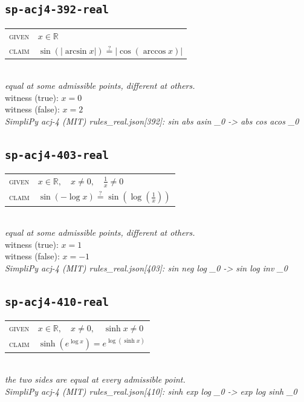 \documentclass[11pt]{article}
\begin{document}
\subsection*{\texttt{sp-acj4-392-real}}
\begin{tabular}{@{}l@{\quad}l@{}}
\textsc{given} & $x \in \mathbb{R}$ \\[4pt]
\textsc{claim} & $\displaystyle \sin\left(\left|\arcsin x\right|\right) \overset{?}{=} \left|\cos\left(\arccos x\right)\right|$ \\
\end{tabular}\\[2pt]
{\small\emph{equal at some admissible points, different at others.}}\\
{\footnotesize\color{gray}witness (true): $x = 0$}\\
{\footnotesize\color{gray}witness (false): $x = 2$}\\
\emph{SimpliPy acj-4 (MIT) rules\_real.json[392]: sin abs asin \_0  ->  abs cos acos \_0}\\

\subsection*{\texttt{sp-acj4-403-real}}
\begin{tabular}{@{}l@{\quad}l@{}}
\textsc{given} & $x \in \mathbb{R},\quad x \neq 0,\quad \frac{1}{x} \neq 0$ \\[4pt]
\textsc{claim} & $\displaystyle \sin\left(-\log x\right) \overset{?}{=} \sin\left(\log\left(\frac{1}{x}\right)\right)$ \\
\end{tabular}\\[2pt]
{\small\emph{equal at some admissible points, different at others.}}\\
{\footnotesize\color{gray}witness (true): $x = 1$}\\
{\footnotesize\color{gray}witness (false): $x = -1$}\\
\emph{SimpliPy acj-4 (MIT) rules\_real.json[403]: sin neg log \_0  ->  sin log inv \_0}\\

\subsection*{\texttt{sp-acj4-410-real}}
\begin{tabular}{@{}l@{\quad}l@{}}
\textsc{given} & $x \in \mathbb{R},\quad x \neq 0,\quad \sinh x \neq 0$ \\[4pt]
\textsc{claim} & $\displaystyle \sinh\left(e^{\log x}\right) = e^{\log\left(\sinh x\right)}$ \\
\end{tabular}\\[2pt]
{\small\emph{the two sides are equal at every admissible point.}}\\
\emph{SimpliPy acj-4 (MIT) rules\_real.json[410]: sinh exp log \_0  ->  exp log sinh \_0}\\
\end{document}
